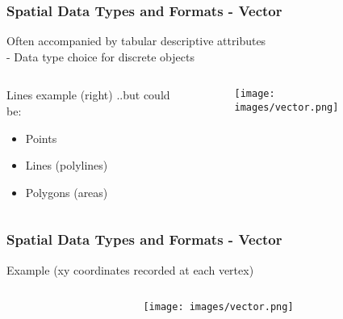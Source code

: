 \documentclass[11pt]{beamer}
\begin{document}
\begin{frame}
\frametitle{Spatial Data Types and Formats - Vector}
Often accompanied by tabular descriptive attributes
\\-  Data type choice for discrete objects
\begin{columns}
\begin{column}{4cm}
Lines example (right)
..but could be:
\begin{itemize}
\item Points
\item Lines (polylines)
\item Polygons (areas)
\end{itemize}
\end{column}
\begin{column}{6cm}
\begin{figure}
\begin{center}
\texttt{[image: images/vector.png]}
\end{center}
\end{figure}
\end{column}
\end{columns}
\end{frame}

\begin{frame}
\frametitle{Spatial Data Types and Formats - Vector}
Example (xy coordinates recorded at each vertex)
\begin{columns}
\begin{column}{5cm}

\end{column}
\begin{column}{5cm}
\begin{figure}
\begin{center}
\texttt{[image: images/vector.png]}
\end{center}
\end{figure}
\end{column}
\end{columns}
\end{frame}
\end{document}

